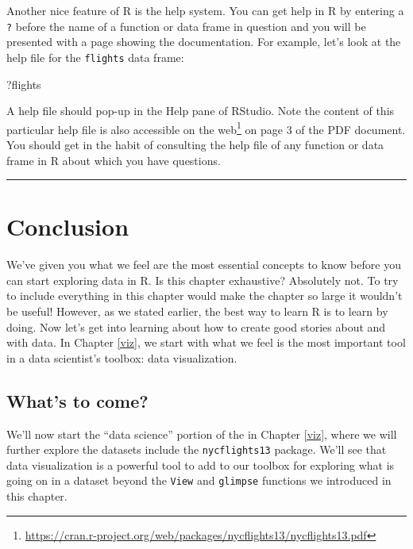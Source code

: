 \documentclass[12pt,]{krantz}
\makeatletter
\newenvironment{Shaded}{\begin{snugshade}}{\end{snugshade}}
\newcommand{\NormalTok}[1]{#1}
\renewcommand{\href}[2]{#2\footnote{\url{#1}}}
\newenvironment{kframe}{%
\medskip{}
\setlength{\fboxsep}{.8em}
 \def\at@end@of@kframe{}%
 \ifinner\ifhmode%
  \def\at@end@of@kframe{\end{minipage}}%
  \begin{minipage}{\columnwidth}%
 \fi\fi%
 \def\FrameCommand##1{\hskip\@totalleftmargin \hskip-\fboxsep
 \colorbox{shadecolor}{##1}\hskip-\fboxsep
     \hskip-\linewidth \hskip-\@totalleftmargin \hskip\columnwidth}%
 \MakeFramed {\advance\hsize-\width
   \@totalleftmargin\z@ \linewidth\hsize
   \@setminipage}}%
 {\par\unskip\endMakeFramed%
 \at@end@of@kframe}
\renewenvironment{Shaded}{\begin{kframe}}{\end{kframe}}
\makeatother
\begin{document}
Another nice feature of R is the help system. You can get help in R by
entering a \texttt{?} before the name of a function or data frame in
question and you will be presented with a page showing the
documentation. For example, let's look at the help file for the
\texttt{flights} data frame:

\begin{Shaded}
\begin{Highlighting}[]
\NormalTok{?flights}
\end{Highlighting}
\end{Shaded}

A help file should pop-up in the Help pane of RStudio. Note the content
of this particular help file is also accessible on the
\href{https://cran.r-project.org/web/packages/nycflights13/nycflights13.pdf}{web}
on page 3 of the PDF document. You should get in the habit of consulting
the help file of any function or data frame in R about which you have
questions.

\begin{center}\rule{0.5\linewidth}{\linethickness}\end{center}

\section{Conclusion}\label{conclusion}

We've given you what we feel are the most essential concepts to know
before you can start exploring data in R. Is this chapter exhaustive?
Absolutely not. To try to include everything in this chapter would make
the chapter so large it wouldn't be useful! However, as we stated
earlier, the best way to learn R is to learn by doing. Now let's get
into learning about how to create good stories about and with data. In
Chapter \ref{viz}, we start with what we feel is the most important tool
in a data scientist's toolbox: data visualization.

\subsection{What's to come?}\label{whats-to-come}

We'll now start the ``data science'' portion of the in Chapter
\ref{viz}, where we will further explore the datasets include the
\texttt{nycflights13} package. We'll see that data visualization is a
powerful tool to add to our toolbox for exploring what is going on in a
dataset beyond the \texttt{View} and \texttt{glimpse} functions we
introduced in this chapter.
\end{document}
